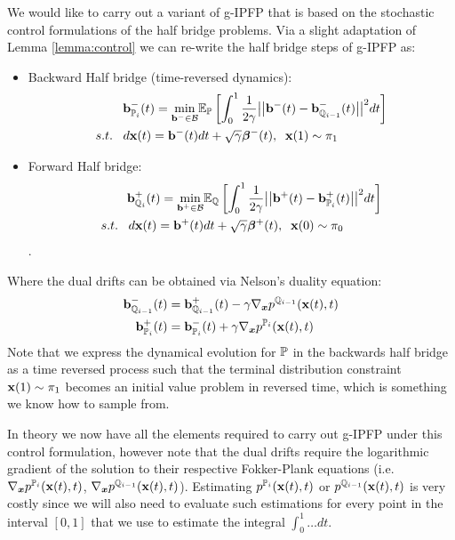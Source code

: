 \documentclass[a4paper,12pt,twoside,openright]{report}
\theoremstyle{definition}
\begin{document}
We would like to carry out a variant of g-IPFP that is based on the stochastic control formulations of the half bridge problems. Via a slight adaptation of Lemma \ref{lemma:control} we can re-write the half bridge steps of g-IPFP as:
\begin{itemize}
\item Backward Half bridge (time-reversed dynamics): 
\begin{align} \label{eq:controlled_haalf_bridge_forward}
  \rvb^{-}_{\P_{i}}(t) = \min_{\rvb^{-} \in \calB }  &\E_\P\left[\int_0^1 \frac{1}{2\gamma}\big|\big|\rvb^{-}(t) -\rvb^{-}_{\Q_{i-1}}(t) \big|\big|^2 dt\right] \nonumber \\
    s.t.\;\;\; d\rvx(t) = \rvb^{-}(t) &dt + \sqrt{\gamma} \rvw^{-}(t), \;\; \rvx(1) \sim \pi_1
\end{align}
\item Forward Half bridge:
\begin{align} \label{eq:controlled_half_bridge_backward}
   \rvb^{+}_{\Q_{i}}(t) =\min_{\rvb^{+} \in \calB } & \E_\Q\left[\int_0^1 \frac{1}{2\gamma}\big|\big|\rvb^{+}(t) -\rvb^{+}_{\P_{i}}(t)\big|\big|^2 dt\right] \nonumber \\
    s.t.\;\;\; d\rvx(t) = \rvb^{+}(t) &dt + \sqrt{\gamma} \rvw^{+}(t), \;\; \rvx(0) \sim \pi_0
\end{align}.
\end{itemize}
Where the dual drifts can be obtained via Nelson's duality equation:
\begin{align*}
      \rvb^{-}_{\Q_{i-1}}(t)   &=\rvb^{+}_{\Q_{i-1}}(t) -\gamma\nabla_{\vx} p^{\Q_{i-1}}(\rvx(t), t) \\
    \rvb^{+}_{\P_{i}}(t) &=  \rvb^{-}_{\P_{i}}(t) +\gamma\nabla_{\vx} p^{\P_{i}}(\rvx(t), t)
\end{align*}
Note that we express the dynamical evolution for $\P$ in the backwards half bridge as a time reversed process \citep{pavon1991free, nelson1967dynamical} such that the terminal distribution constraint $\rvx(1) \sim \pi_1$ becomes an initial value problem in reversed time, which is something we know how to sample from. 

In theory we now have all the elements required to carry out g-IPFP under this control formulation, however note that the dual drifts require the logarithmic gradient of the solution to their respective Fokker-Plank equations (i.e. $\nabla_{\vx} p^{\P_{i}}(\rvx(t), t)$, $\nabla_{\vx} p^{\Q_{i-1}}(\rvx(t), t)$). Estimating $p^{\P_{i}}(\rvx(t), t)$ or $p^{\Q_{i-1}}(\rvx(t), t)$ is very costly since we will also need to evaluate such estimations for every point in the interval $[0,1]$ that we use to estimate the integral $\int_0^1 \hdots dt$.
\end{document}
